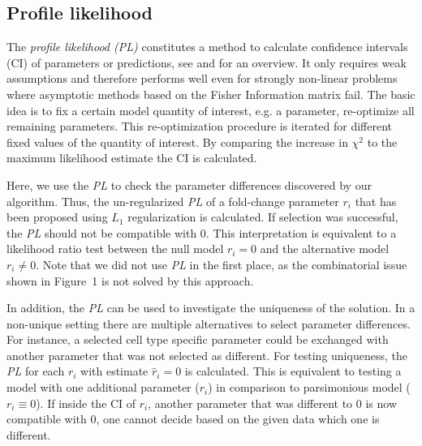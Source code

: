 \documentclass{bioinfo}
\begin{document}
\subsection{Profile likelihood}
The \emph{profile likelihood (PL)} constitutes a method to calculate confidence intervals (CI) of parameters or predictions, see \cite{Raue2009} and \cite{Kreutz2012} for an overview.
It only requires weak assumptions and therefore performs well even for strongly non-linear problems where asymptotic methods based on the Fisher Information matrix fail.
The basic idea is to fix a certain model quantity of interest, e.g. a parameter, re-optimize all remaining parameters. %
This re-optimization procedure is iterated for different fixed values of the quantity of interest.
By comparing the increase in $\chi^2$ to the maximum likelihood estimate the CI is calculated.

Here, we use the \emph{PL} to check the parameter differences discovered by our algorithm.
Thus, the un-regularized \emph{PL} of a fold-change parameter $r_i$ that has been proposed using $L_1$ regularization is calculated.
If selection was successful, the \emph{PL} should not be compatible with 0.
This interpretation is equivalent to a likelihood ratio test between the null model $r_i=0$ and the alternative model $r_i \neq 0$.
Note that we did not use \emph{PL} in the first place, as the combinatorial issue shown in Figure~1\vphantom{\ref{fig:01}} is not solved by this approach.

In addition, the \emph{PL} can be used to investigate the uniqueness of the solution.
In a non-unique setting there are multiple alternatives to select parameter differences.
For instance, a selected cell type specific parameter could be exchanged with another parameter that was not selected as different.
For testing uniqueness, the \emph{PL} for each $r_i$ with estimate $\hat r_i=0$ is calculated.
This is equivalent to testing a model with one additional parameter ($r_i$) in comparison to parsimonious model ($r_i \equiv 0$).
If inside the CI of $r_i$, another parameter that was different to $0$ is now compatible with $0$, one cannot decide based on the given data which one is different.

\end{document}
